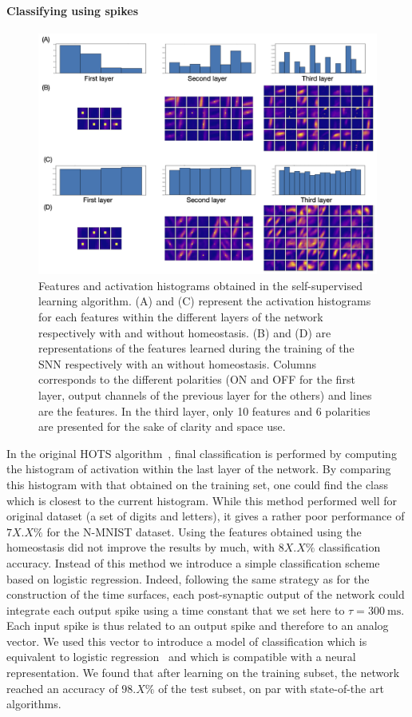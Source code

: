 \documentclass[12pt]{article}
\newcommand{\citep}[1]{\parencite{#1}}
\newcommand{\citet}[1]{\textcite{#1}}
\newcommand{\ms}{\si{\milli\second}}%
\begin{document}
\paragraph*{Classifying using spikes}
\begin{figure}[!ht]%
\centering
\includegraphics[width=.9\linewidth]{layerz.png}
\caption
{Features and activation histograms obtained in the self-supervised learning algorithm. (A) and (C) represent the activation histograms for each features within the different layers of the network respectively with and without homeostasis. (B) and (D) are representations of the features learned during the training of the SNN respectively with an without homeostasis. Columns corresponds to the different polarities (ON and OFF for the first layer, output channels of the previous layer for the others) and lines are the features. In the third layer, only 10 features and 6 polarities are presented for the sake of clarity and space use.
\label{fig:fig2}
}
\end{figure}
In the original HOTS algorithm~\citet{Lagorce17}, final classification is performed by computing the histogram of activation within the last layer of the network. By comparing this histogram with that obtained on the training set, one could find the class which is closest to the current histogram. While this method performed well for original dataset (a set of digits and letters), it gives a rather poor performance of $7X.X\%$ for the N-MNIST dataset. Using the features obtained using the homeostasis did not improve the results by much, with $8X.X\%$ classification accuracy. 
Instead of this method we introduce a simple classification scheme based on logistic regression. Indeed, following the same strategy as for the construction of the time surfaces, each post-synaptic output of the network could integrate each output spike using a time constant that we set here to $\tau=300~\ms$. Each input spike is thus related to an output spike and therefore to an analog vector. We used this vector to introduce a model of classification which is equivalent to logistic regression~\citep{Berens12} and which is compatible with a neural representation. We found that after learning on the training subset, the network reached an accuracy of $98.X\%$ of the test subset, on par with state-of-the art algorithms.
%
\end{document}
